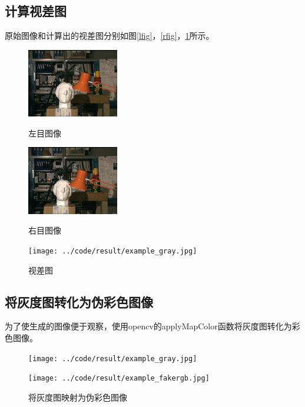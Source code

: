 \documentclass[]{article}
\begin{document}
    \subsection{计算视差图}
        原始图像和计算出的视差图分别如图\ref{lfig}，\ref{rfig}，\ref{disfig}所示。
        \begin{figure}[htbp]
            \centering
            \begin{minipage}[t]{0.3\textwidth}
                \centering
                \includegraphics[width=4cm]{../code/dataset/l.png}
                \caption{左目图像}
                \label{lfig}
            \end{minipage}
            \begin{minipage}[t]{0.3\textwidth}
                \centering
                \includegraphics[width=4cm]{../code/dataset/r.png}
                \caption{右目图像}
                \label{rfig}
            \end{minipage}
            \begin{minipage}[t]{0.3\textwidth}
                \centering
                \texttt{[image: ../code/result/example\_gray.jpg]}
                \caption{视差图}
                \label{disfig}
            \end{minipage}
        \end{figure}

    \subsection{将灰度图转化为伪彩色图像}
    为了使生成的图像便于观察，使用opencv的applyMapColor函数将灰度图转化为彩色图像。

    \begin{figure}[htbp]
        \centering
        \begin{minipage}[t]{0.4\textwidth}
            \centering
            \texttt{[image: ../code/result/example\_gray.jpg]}
        \end{minipage}
        \begin{minipage}[t]{0.4\textwidth}
            \centering
            \texttt{[image: ../code/result/example\_fakergb.jpg]}
        \end{minipage}
        \caption{将灰度图映射为伪彩色图像}
    \end{figure}
\end{document}
